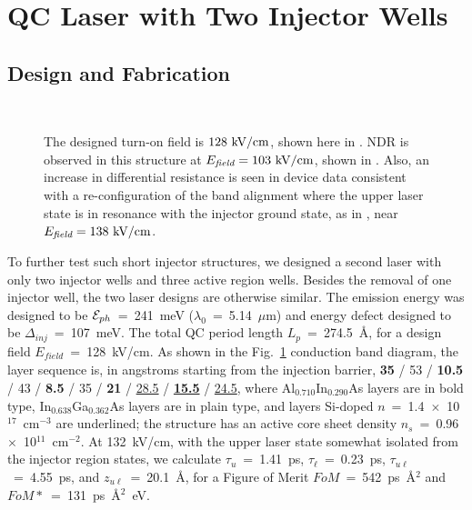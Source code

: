\section{QC Laser with Two Injector Wells}

\subsection{Design and Fabrication}

\begin{figure}[tp]%
\centering%
%
\\%
%
\hfil%
%
\caption[Energy band diagrams for the two injector well QC structure]{  The designed turn-on field is $128~\textnormal{kV/cm}$, shown here in .  NDR is observed in this structure at $E_\textit{field}=103~\textnormal{kV/cm}$, shown in .  Also, an increase in differential resistance is seen in device data consistent with a re-configuration of the band alignment where the upper laser state is in resonance with the injector ground state, as in , near $E_\textit{field}=138~\textnormal{kV/cm}$.}
\label{2well:band_diagrams}
\end{figure}

To further test such short injector structures, we designed a second laser with only two injector wells and three active region wells.  Besides the removal of one injector well, the two laser designs are otherwise similar.  The emission energy was designed to be $\EE_{ph}$~=~241~meV ($\lambda_0$~=~5.14~$\mu$m) and energy defect designed to be $\Delta_{inj}$~=~107~meV.  The total QC period length $L_p$~=~274.5~\AA, for a design field $E_\textit{field}$~=~128~kV/cm.  As shown in the Fig.~\ref{2well:band_diagrams} conduction band diagram, the layer sequence is, in angstroms starting from the injection barrier, \textbf{35} / 53 / \textbf{10.5} / 43 / \textbf{8.5} / 35 / \textbf{21} / \underline{28.5} / \underline{\textbf{15.5}} / \underline{24.5}, where Al$_{0.710}$In$_{0.290}$As layers are in bold type, In$_{0.638}$Ga$_{0.362}$As layers are in plain type, and layers Si-doped $n$~=~1.4~$\times$~10$^{17}$~cm$^{-3}$ are underlined; the structure has an active core sheet density $n_s$~=~0.96~$\times$~10$^{11}$~cm$^{-2}$.  At 132~kV/cm, with the upper laser state somewhat isolated from the injector region states, we calculate $\tau_u$~=~1.41~ps, $\tau_\ell$~=~0.23~ps, $\tau_{u\ell}$~=~4.55~ps, and $z_{u\ell}$~=~20.1~\AA, for a Figure of Merit $FoM$~=~542~ps~\AA$^2$ and $FoM*$~=~131~ps~\AA$^2$~eV.  %

